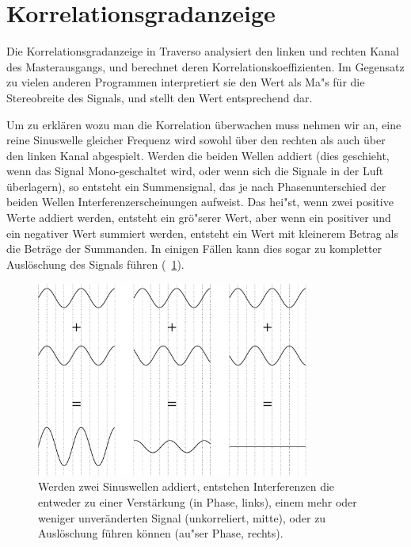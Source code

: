 \section{Korrelationsgradanzeige}
Die Korrelationsgradanzeige in Traverso analysiert den linken und rechten Kanal des Masterausgangs, und berechnet deren Korrelationskoeffizienten. Im Gegensatz zu vielen anderen Programmen interpretiert sie den Wert als Ma"s für die Stereobreite des Signals, und stellt den Wert entsprechend dar.

Um zu erklären wozu man die Korrelation überwachen muss nehmen wir an, eine reine Sinuswelle gleicher Frequenz wird sowohl über den rechten als auch über den linken Kanal abgespielt. Werden die beiden Wellen addiert (dies geschieht, wenn das Signal Mono-geschaltet wird, oder wenn sich die Signale in der Luft überlagern), so entsteht ein Summensignal, das je nach Phasenunterschied der beiden Wellen Interferenzerscheinungen aufweist. Das hei"st, wenn zwei positive Werte addiert werden, entsteht ein grö"serer Wert, aber wenn ein positiver und ein negativer Wert summiert werden, entsteht ein Wert mit kleinerem Betrag als die Beträge der Summanden. In einigen Fällen kann dies sogar zu kompletter Auslöschung des Signals führen (\FigB\ \ref{fig_interference}).

\begin{figure}
	\centering\includegraphics[width=0.8\textwidth]{../images/sine01}
	\caption{Werden zwei Sinuswellen addiert, entstehen Interferenzen die entweder zu einer Verstärkung (in Phase, links), einem mehr oder weniger unveränderten Signal (unkorreliert, mitte), oder zu Auslöschung führen können (au"ser Phase, rechts).}
	\label{fig_interference}
\end{figure}

